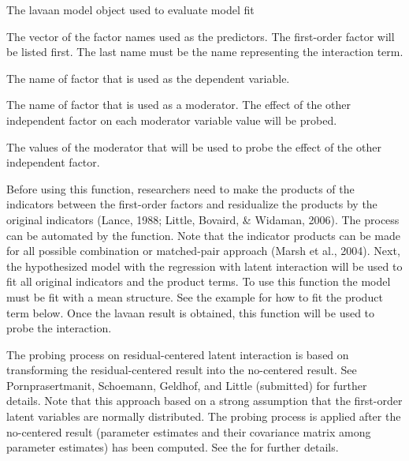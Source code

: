 \documentclass[a4paper]{book}
\begin{document}
%
\begin{Arguments}
\begin{ldescription}
\item[\code{fit}] The lavaan model object used to evaluate model fit
\item[\code{nameX}] The vector of the factor names used as the predictors. The first-order factor will be listed first. The last name must be the name representing the interaction term.
\item[\code{nameY}] The name of factor that is used as the dependent variable.
\item[\code{modVar}] The name of factor that is used as a moderator. The effect of the other independent factor on each moderator variable value will be probed.
\item[\code{valProbe}] The values of the moderator that will be used to probe the effect of the other independent factor.
\end{ldescription}
\end{Arguments}
%
\begin{Details}\relax
Before using this function, researchers need to make the products of the indicators between the first-order factors and residualize the products by the original indicators (Lance, 1988; Little, Bovaird, \& Widaman, 2006). The process can be automated by the  function. Note that the indicator products can be made for all possible combination or matched-pair approach (Marsh et al., 2004). Next, the hypothesized model with the regression with latent interaction will be used to fit all original indicators and the product terms. To use this function the model must be fit with a mean structure. See the example for how to fit the product term below. Once the lavaan result is obtained, this function will be used to probe the interaction.  

The probing process on residual-centered latent interaction is based on transforming the residual-centered result into the no-centered result. See Pornprasertmanit, Schoemann, Geldhof, and Little (submitted) for further details. Note that this approach based on a strong assumption that the first-order latent variables are normally distributed. The probing process is applied after the no-centered result (parameter estimates and their covariance matrix among parameter estimates) has been computed. See the  for further details.
\end{Details}
%
\end{document}
